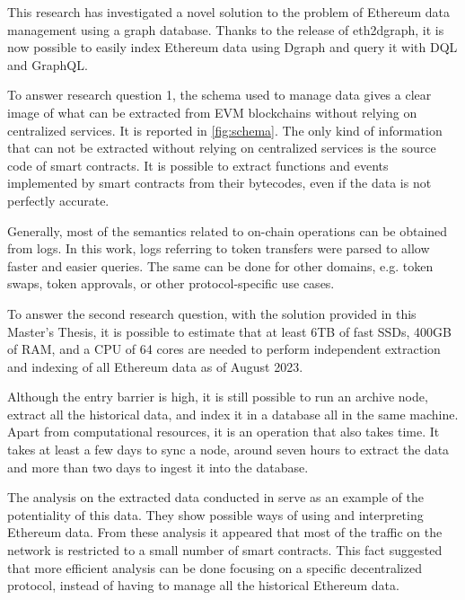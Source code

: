 \label{chapter-conclusions}

This research has investigated a novel solution to the problem of Ethereum data management using a graph database. Thanks to the release of eth2dgraph, it is now possible to easily index Ethereum data using Dgraph and query it with DQL and GraphQL. 

To answer research question 1, the schema used to manage data gives a clear image of what can be extracted from EVM blockchains without relying on centralized services. It is reported in \cref{fig:schema}. The only kind of information that can not be extracted without relying on centralized services is the source code of smart contracts. It is possible to extract functions and events implemented by smart contracts from their bytecodes, even if the data is not perfectly accurate.

Generally, most of the semantics related to on-chain operations can be obtained from logs. In this work, logs referring to token transfers were parsed to allow faster and easier queries. The same can be done for other domains, e.g. token swaps, token approvals, or other protocol-specific use cases.

To answer the second research question, with the solution provided in this Master's Thesis, it is possible to estimate that at least 6TB of fast SSDs, 400GB of RAM, and a CPU of 64 cores are needed to perform independent extraction and indexing of all Ethereum data as of August 2023. 

Although the entry barrier is high, it is still possible to run an archive node, extract all the historical data, and index it in a database all in the same machine. Apart from computational resources, it is an operation that also takes time. It takes at least a few days to sync a node, around seven hours to extract the data and more than two days to ingest it into the database.

The analysis on the extracted data conducted in  serve as an example of the potentiality of this data. They show possible ways of using and interpreting Ethereum data. From these analysis it appeared that most of the traffic on the network is restricted to a small number of smart contracts. This fact suggested that more efficient analysis can be done focusing on a specific decentralized protocol, instead of having to manage all the historical Ethereum data.

